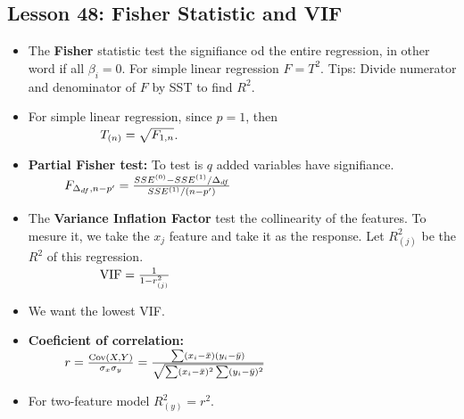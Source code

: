 \documentclass[10pt, french]{article}
\begin{document}
\begin{multicols*}{3}
\section*{Lesson 48: Fisher Statistic and VIF}
\begin{itemize}[align=left,leftmargin=*]
  \item The \textbf{Fisher} statistic test the signifiance od the entire regression, in other word if all $\beta_i = 0$. For simple linear regression $F = T^2$.
  Tips: Divide numerator and denominator of $F$ by SST to find $R^2$.
  \item For simple linear regression, since $p=1$, then \\
  $\hspace*{2cm} T_{(n)} = \sqrt{F_{1,n}}$.
  \item \textbf{Partial Fisher test:} To test is $q$ added variables have signifiance. \\
  $\hspace*{1cm} F_{\Delta_{df},n-p'} = \frac{SSE^{(0)} - SSE^{(1)}/\Delta_{df}}{SSE^{(1)}/(n-p')}$
  \item The \textbf{Variance Inflation Factor} test the collinearity of the features. To mesure it, we take the $x_j$ feature and take it as the response. Let $R_{(j)}^2$ be the $R^2$ of this regression. \\
  $\hspace*{2cm} \textrm{VIF} = \frac{1}{1 - r_{(j)}^2}$
  \item[] We want the lowest VIF.
  \item \textbf{Coeficient of correlation:} \\
  $\hspace*{1cm} r = \frac{\mathrm{Cov} {\left( X,Y \right)}}{\sigma_x \sigma_y} = \frac{\sum (x_i-\bar{x})(y_i - \bar{y}) }{\sqrt{\sum (x_i-\bar{x})^2 \sum (y_i - \bar{y})^2}}$
  \item For two-feature model $R_{(y)}^2 = r^2$.

\end{itemize}


\end{multicols*}
\end{document}
